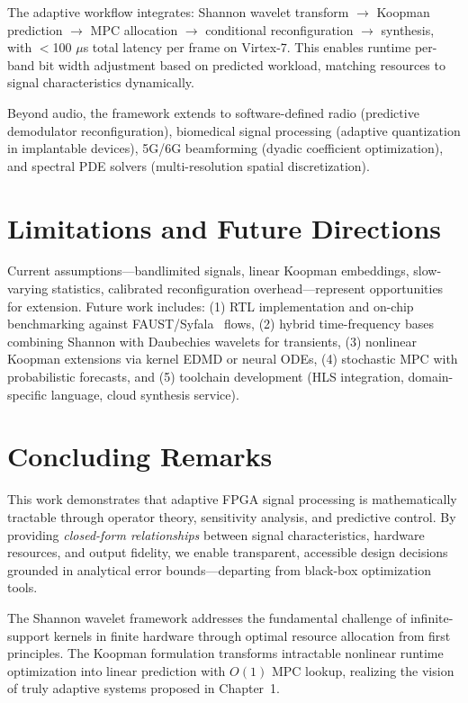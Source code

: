 The adaptive workflow integrates: Shannon wavelet transform $\to$ Koopman prediction $\to$ MPC allocation $\to$ conditional reconfiguration $\to$ synthesis, with $<$100 $\mu$s total latency per frame on Virtex-7. This enables runtime per-band bit width adjustment based on predicted workload, matching resources to signal characteristics dynamically.

Beyond audio, the framework extends to software-defined radio (predictive demodulator reconfiguration), biomedical signal processing (adaptive quantization in implantable devices), 5G/6G beamforming (dyadic coefficient optimization), and spectral PDE solvers (multi-resolution spatial discretization).

\section{Limitations and Future Directions}

Current assumptions—bandlimited signals, linear Koopman embeddings, slow-varying statistics, calibrated reconfiguration overhead—represent opportunities for extension. Future work includes: (1) RTL implementation and on-chip benchmarking against FAUST/Syfala~\cite{Syfala2024} flows, (2) hybrid time-frequency bases combining Shannon with Daubechies wavelets for transients, (3) nonlinear Koopman extensions via kernel EDMD or neural ODEs, (4) stochastic MPC with probabilistic forecasts, and (5) toolchain development (HLS integration, domain-specific language, cloud synthesis service).

\section{Concluding Remarks}

This work demonstrates that adaptive FPGA signal processing is mathematically tractable through operator theory, sensitivity analysis, and predictive control. By providing \emph{closed-form relationships} between signal characteristics, hardware resources, and output fidelity, we enable transparent, accessible design decisions grounded in analytical error bounds—departing from black-box optimization tools.

The Shannon wavelet framework addresses the fundamental challenge of infinite-support kernels in finite hardware through optimal resource allocation from first principles. The Koopman formulation transforms intractable nonlinear runtime optimization into linear prediction with $O(1)$ MPC lookup, realizing the vision of truly adaptive systems proposed in Chapter~1.

